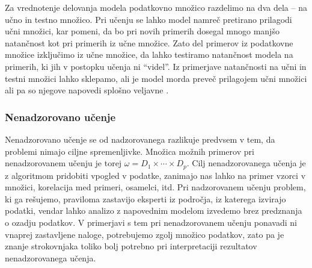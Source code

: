 \documentclass[12pt,a4paper,twoside]{article}
\theoremstyle{definition} %
\theoremstyle{plain} %
\numberwithin{equation}{section}  %
\begin{document}
Za vrednotenje delovanja modela podatkovno množico razdelimo na dva dela -- na učno in testno množico.
Pri učenju se lahko model namreč pretirano prilagodi učni množici, kar pomeni, da bo pri novih primerih dosegal mnogo manjšo natančnost kot pri primerih iz učne množice.
Zato del primerov iz podatkovne množice izključimo iz učne množice, da lahko testiramo natančnost modela na primerih, ki jih v postopku učenja ni ``videl''.
Iz primerjave natančnosti na učni in testni množici lahko sklepamo, ali je model morda preveč prilagojem učni množici ali pa so njegove napovedi splošno veljavne .




\subsubsection{Nenadzorovano učenje}

Nenadzorovano učenje se od nadzorovanega razlikuje predvsem v tem, da problemi nimajo ciljne spremenljivke. 
Množica možnih primerov pri nenadzorovanem učenju je torej $\omega = D_1 \times \cdots \times D_p$.
Cilj nenadzorovanega učenja je z algoritmom pridobiti vpogled v podatke, zanimajo nas lahko na primer vzorci v množici, korelacija med primeri, osamelci, itd.
Pri nadzorovanem učenju problem, ki ga rešujemo, praviloma zastavijo eksperti iz področja, iz katerega izvirajo podatki, vendar lahko analizo z napovednim modelom izvedemo brez predznanja o ozadju podatkov.
V primerjavi s tem pri nenadzorovanem učenju ponavadi ni vnaprej zastavljene naloge, potrebujemo zgolj množico podatkov, zato pa je znanje strokovnjaka toliko bolj potrebno pri interpretaciji rezultatov nenadzorovanega učenja.
\end{document}
